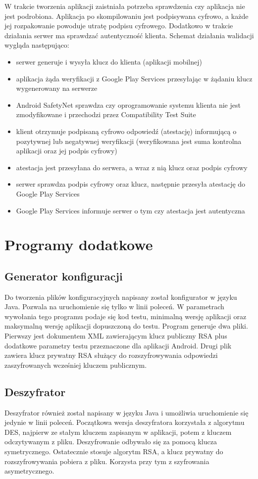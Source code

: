 \documentclass[archivemod, eng]{mgr}
\begin{document}
			W trakcie tworzenia aplikacji zaistniała potrzeba sprawdzenia czy aplikacja nie jest podrobiona. Aplikacja po skompilowaniu jest podpisywana cyfrowo, a każde jej rozpakowanie powoduje utratę podpisu cyfrowego. Dodatkowo w trakcie działania serwer ma sprawdzać autentyczność klienta. Schemat działania walidacji wygląda następująco:
			\begin{itemize}
				\item serwer generuje i wysyła klucz do klienta (aplikacji mobilnej)
				\item aplikacja żąda weryfikacji z Google Play Services przesyłając w żądaniu klucz wygenerowany na serwerze
				\item Android SafetyNet sprawdza czy oprogramowanie systemu klienta nie jest zmodyfikowane i przechodzi przez Compatibility Test Suite
				\item klient otrzymuje podpisaną cyfrowo odpowiedź (atestację) informującą o pozytywnej lub negatywnej weryfikacji (weryfikowana jest suma kontrolna aplikacji oraz jej podpis cyfrowy)
				\item atestacja jest przesyłana do serwera, a wraz z nią klucz oraz podpis cyfrowy
				\item serwer sprawdza podpis cyfrowy oraz klucz, następnie przesyła atestację do Google Play Services
				\item Google Play Services informuje serwer o tym czy atestacja jest autentyczna
			\end{itemize}
			
		\section{Programy dodatkowe}
		
			\subsection{Generator konfiguracji}
			Do tworzenia plików konfiguracyjnych napisany został konfigurator w języku Java. Pozwala na uruchomienie się tylko w linii poleceń. W parametrach wywołania tego programu podaje się kod testu, minimalną wersję aplikacji oraz maksymalną wersję aplikacji dopuszczoną do testu. Program generuje dwa pliki. Pierwszy jest dokumentem XML zawierającym klucz publiczny RSA plus dodatkowe parametry testu przeznaczone dla aplikacji Android. Drugi plik zawiera klucz prywatny RSA służący do rozszyfrowywania odpowiedzi zaszyfrowanych wcześniej kluczem publicznym.
			
			\subsection{Deszyfrator}
			Deszyfrator również został napisany w języku Java i umożliwia uruchomienie się jedynie w linii poleceń. Początkowa wersja deszyfratora korzystała z algorytmu DES, najpierw ze stałym kluczem zapisanym w aplikacji, potem z kluczem odczytywanym z pliku. Deszyfrowanie odbywało się za pomocą klucza symetrycznego. Ostatecznie stosuje algorytm RSA, a klucz prywatny do rozszyfrowywania pobiera z pliku. Korzysta przy tym z szyfrowania asymetrycznego.
			
\end{document}
